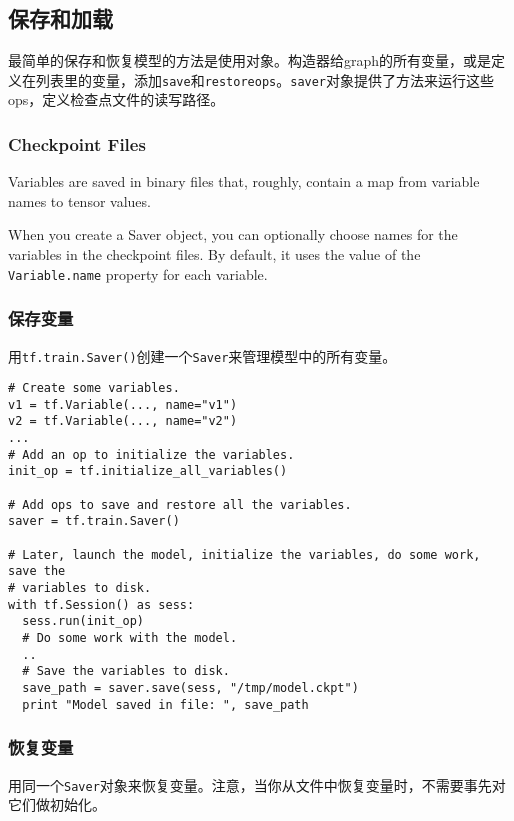 \subsection {保存和加载}
最简单的保存和恢复模型的方法是使用对象。构造器给graph的所有变量，或是定义在列表里的变量，添加\lstinline{save}和\lstinline{restoreops}。\lstinline{saver}对象提供了方法来运行这些ops，定义检查点文件的读写路径。

\subsubsection{Checkpoint Files}
Variables are saved in binary files that, roughly, contain a map from variable names to tensor values.

When you create a Saver object, you can optionally choose names for the variables in the checkpoint files. By default, it uses the value of the \lstinline{Variable.name} property for each variable.

\subsubsection{保存变量}

用\lstinline{tf.train.Saver()}创建一个\lstinline{Saver}来管理模型中的所有变量。

\begin{lstlisting}
# Create some variables.
v1 = tf.Variable(..., name="v1")
v2 = tf.Variable(..., name="v2")
...
# Add an op to initialize the variables.
init_op = tf.initialize_all_variables()

# Add ops to save and restore all the variables.
saver = tf.train.Saver()

# Later, launch the model, initialize the variables, do some work, save the
# variables to disk.
with tf.Session() as sess:
  sess.run(init_op)
  # Do some work with the model.
  ..
  # Save the variables to disk.
  save_path = saver.save(sess, "/tmp/model.ckpt")
  print "Model saved in file: ", save_path
\end{lstlisting}

\subsubsection{恢复变量}

用同一个\lstinline{Saver}对象来恢复变量。注意，当你从文件中恢复变量时，不需要事先对它们做初始化。

